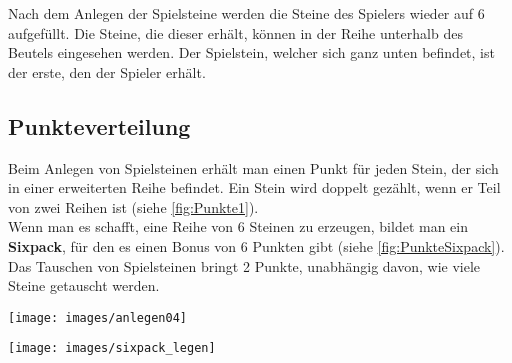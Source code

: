 \documentclass[a4paper, ngerman]{scrartcl}
\begin{document}
Nach dem Anlegen der Spielsteine werden die Steine des Spielers wieder auf 6
aufgefüllt. Die Steine, die dieser erhält, können in der Reihe unterhalb des
Beutels eingesehen werden. Der Spielstein, welcher sich ganz unten befindet, ist der erste, den der Spieler erhält.\\
	
 \subsection*{Punkteverteilung}
Beim Anlegen von Spielsteinen erhält man einen Punkt für jeden Stein, der sich in einer erweiterten Reihe befindet. Ein Stein wird doppelt gezählt, wenn er Teil von zwei Reihen ist (siehe \autoref{fig:Punkte1}).\\
Wenn man es schafft, eine Reihe von 6 Steinen zu erzeugen, bildet man ein \textbf{Sixpack}, für den es einen Bonus von 6 Punkten gibt (siehe \autoref{fig:PunkteSixpack}).\\
Das Tauschen von Spielsteinen bringt 2 Punkte, unabhängig davon, wie viele
Steine getauscht werden.

\begin{minipage}[c]{0.4\textwidth}
	\texttt{[image: images/anlegen04]}
	\label{fig:Punkte1}
\end{minipage}
\hspace{0.1\textwidth}
\begin{minipage}[c]{0.4\textwidth}
	\centering	
	\texttt{[image: images/sixpack\_legen]}
	\label{fig:PunkteSixpack}
\end{minipage}

	
\end{document}

